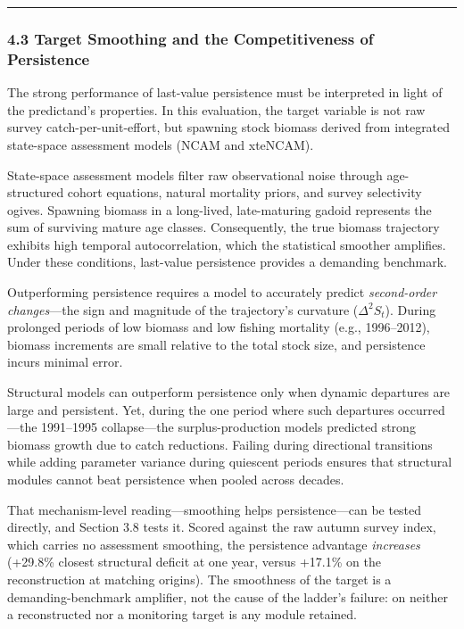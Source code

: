 \documentclass[11pt]{article}
\begin{document}
\begin{center}\rule{0.5\linewidth}{0.5pt}\end{center}

\subsubsection{4.3 Target Smoothing and the Competitiveness of
Persistence}\label{target-smoothing-and-the-competitiveness-of-persistence}

The strong performance of last-value persistence must be interpreted in
light of the predictand's properties. In this evaluation, the target
variable is not raw survey catch-per-unit-effort, but spawning stock
biomass derived from integrated state-space assessment models (NCAM and
xteNCAM).

State-space assessment models filter raw observational noise through
age-structured cohort equations, natural mortality priors, and survey
selectivity ogives. Spawning biomass in a long-lived, late-maturing
gadoid represents the sum of surviving mature age classes. Consequently,
the true biomass trajectory exhibits high temporal autocorrelation,
which the statistical smoother amplifies. Under these conditions,
last-value persistence provides a demanding benchmark.

Outperforming persistence requires a model to accurately predict
\emph{second-order changes}---the sign and magnitude of the trajectory's
curvature (\(\Delta^2 S_t\)). During prolonged periods of low biomass
and low fishing mortality (e.g., 1996--2012), biomass increments are
small relative to the total stock size, and persistence incurs minimal
error.

Structural models can outperform persistence only when dynamic
departures are large and persistent. Yet, during the one period where
such departures occurred---the 1991--1995 collapse---the
surplus-production models predicted strong biomass growth due to catch
reductions. Failing during directional transitions while adding
parameter variance during quiescent periods ensures that structural
modules cannot beat persistence when pooled across decades.

That mechanism-level reading---smoothing helps persistence---can be
tested directly, and Section 3.8 tests it. Scored against the raw autumn
survey index, which carries no assessment smoothing, the persistence
advantage \emph{increases} (+29.8\% closest structural deficit at one
year, versus +17.1\% on the reconstruction at matching origins). The
smoothness of the target is a demanding-benchmark amplifier, not the
cause of the ladder's failure: on neither a reconstructed nor a
monitoring target is any module retained.
\end{document}
